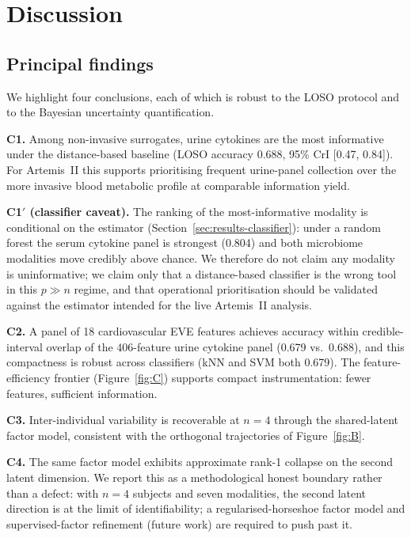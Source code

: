 \documentclass[11pt,a4paper,3p,authoryear]{elsarticle}
\begin{document}
\section{Discussion}\label{sec:discussion}

\subsection{Principal findings}

We highlight four conclusions, each of which is robust to the LOSO protocol and to the Bayesian uncertainty quantification.

\textbf{C1.} Among non-invasive surrogates, urine cytokines are the most informative under the distance-based baseline (LOSO accuracy 0.688, 95\% CrI {[}0.47, 0.84{]}). For Artemis~II this supports prioritising frequent urine-panel collection over the more invasive blood metabolic profile at comparable information yield.

\textbf{C1$'$ (classifier caveat).} The ranking of the most-informative modality is conditional on the estimator (Section~\ref{sec:results-classifier}): under a random forest the serum cytokine panel is strongest (0.804) and both microbiome modalities move credibly above chance. We therefore do not claim any modality is uninformative; we claim only that a distance-based classifier is the wrong tool in this $p \gg n$ regime, and that operational prioritisation should be validated against the estimator intended for the live Artemis~II analysis.

\textbf{C2.} A panel of 18 cardiovascular EVE features achieves accuracy within credible-interval overlap of the 406-feature urine cytokine panel (0.679 vs.\ 0.688), and this compactness is robust across classifiers (kNN and SVM both 0.679). The feature-efficiency frontier (Figure~\ref{fig:C}) supports compact instrumentation: fewer features, sufficient information.

\textbf{C3.} Inter-individual variability is recoverable at $n=4$ through the shared-latent factor model, consistent with the orthogonal trajectories of Figure~\ref{fig:B}.

\textbf{C4.} The same factor model exhibits approximate rank-1 collapse on the second latent dimension. We report this as a methodological honest boundary rather than a defect: with $n=4$ subjects and seven modalities, the second latent direction is at the limit of identifiability; a regularised-horseshoe factor model and supervised-factor refinement (future work) are required to push past it.
\end{document}
